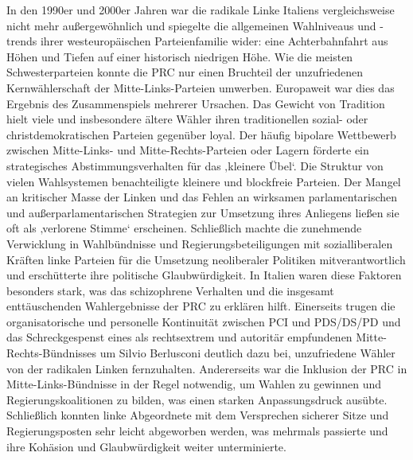 \begin{multicols*}{2}
In den 1990er und 2000er Jahren war die radikale Linke Italiens vergleichsweise nicht mehr außergewöhnlich und spiegelte die allgemeinen Wahlniveaus und -trends ihrer westeuropäischen Parteienfamilie wider: eine Achterbahnfahrt aus Höhen und Tiefen auf einer historisch niedrigen Höhe. Wie die meisten Schwesterparteien konnte die PRC nur einen Bruchteil der unzufriedenen Kernwählerschaft der Mitte-Links-Parteien umwerben. Europaweit war dies das Ergebnis des Zusammenspiels mehrerer Ursachen. Das Gewicht von Tradition hielt viele und insbesondere ältere Wähler ihren traditionellen sozial- oder christdemokratischen Parteien gegenüber loyal. Der häufig bipolare Wettbewerb zwischen Mitte-Links- und Mitte-Rechts-Parteien oder Lagern förderte ein strategisches Abstimmungsverhalten für das ‚kleinere Übel‘. Die Struktur von vielen Wahlsystemen benachteiligte kleinere und blockfreie Parteien. Der Mangel an kritischer Masse der Linken und das Fehlen an wirksamen parlamentarischen und außerparlamentarischen Strategien zur Umsetzung ihres Anliegens ließen sie oft als ‚verlorene Stimme‘ erscheinen. Schließlich machte die zunehmende Verwicklung in Wahlbündnisse und Regierungsbeteiligungen mit sozialliberalen Kräften linke Parteien für die Umsetzung neoliberaler Politiken mitverantwortlich und erschütterte ihre politische Glaubwürdigkeit. In Italien waren diese Faktoren besonders stark, was das schizophrene Verhalten und die insgesamt enttäuschenden Wahlergebnisse der PRC zu erklären hilft. Einerseits trugen die organisatorische und personelle Kontinuität zwischen PCI und PDS/DS/PD und das Schreckgespenst eines als rechtsextrem und autoritär empfundenen Mitte-Rechts-Bündnisses um Silvio Berlusconi deutlich dazu bei, unzufriedene Wähler von der radikalen Linken fernzuhalten. Andererseits war die Inklusion der PRC in Mitte-Links-Bündnisse in der Regel notwendig, um Wahlen zu gewinnen und Regierungskoalitionen zu bilden, was einen starken Anpassungsdruck ausübte. Schließlich konnten linke Abgeordnete mit dem Versprechen sicherer Sitze und Regierungsposten sehr leicht abgeworben werden, was mehrmals passierte und ihre Kohäsion und Glaubwürdigkeit weiter unterminierte.


\end{multicols*}

